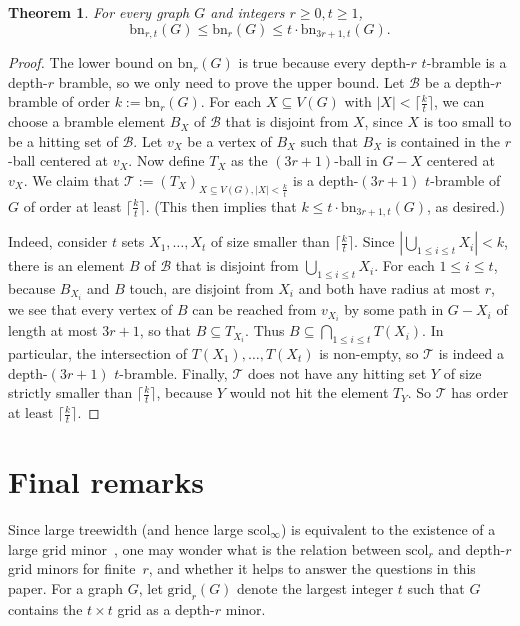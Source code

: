 \documentclass[final]{dmtcs-episciences}
\newtheorem{thm}{Theorem}
\theoremstyle{definition}
\theoremstyle{remark}
\newcommand{\dep}{depth}
\newcommand{\scol}{\ensuremath{\mathrm{scol}}}
\newcommand{\tangle}{\ensuremath{\mathrm{tn}}}
\newcommand{\bn}{\ensuremath{\mathrm{bn}}}
\newcommand{\GR}{\ensuremath{\mathrm{grid}}}
\renewcommand{\leq}{\leqslant}
\renewcommand{\geq}{\geqslant}
\begin{document}
\begin{thm}
For every graph $G$ and integers $r\geq 0, t\geq 1$,
$$\bn_{r,t}(G) \leq \bn_r(G) \leq t\cdot \bn_{3r+1,t}(G).$$
\end{thm}
\begin{proof}
The lower bound on $\bn_r(G)$ is true because every \dep-$r$ $t$-bramble is a \dep-$r$ bramble, so we only need to prove the upper bound.
Let $\mathcal{B}$ be a \dep-$r$ bramble of order $k:=\bn_r(G)$.
For each $X\subseteq V(G)$ with $|X|< \lceil \tfrac{k}{t} \rceil$, we can choose a bramble element $B_X$ of $\mathcal{B}$ that is disjoint from $X$, since $X$ is too small to be a hitting set of $\mathcal{B}$. Let $v_X$ be a vertex of $B_X$ such that $B_X$ is contained in the $r$-ball centered at $v_X$. Now define $T_X$ as the $(3r+1)$-ball in $G-X$ centered at $v_X$. 
We claim that $\mathcal{T}:= \left( T_X \right)_{X \subseteq V(G), |X| < \tfrac{k}{t} }$ is a \dep-$(3r+1)$ $t$-bramble of $G$ of order at least $\lceil \tfrac{k}{t} \rceil$. (This then implies that $k\leq t\cdot \bn_{3r+1,t}(G)$, as desired.)


Indeed, consider $t$ sets $X_1, \ldots, X_t$ of size smaller than $\lceil \tfrac{k}{t} \rceil$. 
Since $|\bigcup_{1\leq i \leq t} X_i|< k$, there is an element $B$ of $\mathcal{B}$ that is disjoint from $\bigcup_{1\leq i \leq t} X_i$.  For each $1\leq i \leq t$, because $B_{X_i}$ and $B$ touch, are disjoint from $X_i$ and both have radius at most $r$, we see that every vertex of $B$ can be reached from $v_{X_i}$ by some path in $G-X_i$ of length at most $3r+1$, so that $B \subseteq T_{X_i}$.
Thus $B \subseteq \bigcap_{1\leq i \leq t} T(X_i)$. In particular, the intersection of $T(X_1),\ldots, T(X_t)$ is non-empty, so $\mathcal{T}$ is indeed a \dep-$(3r+1)$ $t$-bramble. Finally,  $\mathcal{T}$ does not have any hitting set $Y$ of size strictly smaller than $\lceil \tfrac{k}{t} \rceil$, because $Y$ would not hit the element $T_{Y}$. So $\mathcal{T}$ has order at least $\lceil \tfrac{k}{t} \rceil$.
\end{proof}


\section{Final remarks}\label{sec:ccl}

Since large treewidth (and hence large $\scol_{\infty}$) is equivalent to the existence of a large grid minor~\cite{RobertsonSeymourV}, one may wonder what is the relation between $\scol_r$ and depth-$r$ grid minors for finite~$r$, and whether it helps to answer the questions in this paper. For a graph $G$, let $\GR_r(G)$ denote the largest integer $t$ such that $G$ contains the $t \times t$ grid as a depth-$r$ minor. \\
\end{document}
